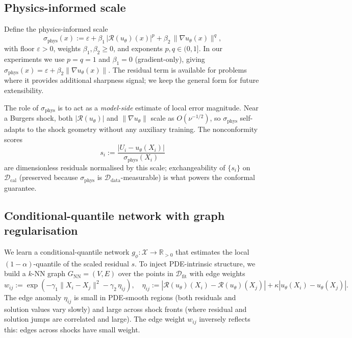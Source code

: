 \documentclass[11pt]{article}
\theoremstyle{definition}
\theoremstyle{remark}
\newcommand{\R}{\mathbb{R}}
\newcommand{\Ddata}{\mathcal{D}_{\text{data}}}
\newcommand{\Dfit}{\mathcal{D}_{\text{fit}}}
\newcommand{\Dcal}{\mathcal{D}_{\text{cal}}}
\newcommand{\sphys}{\sigma_{\mathrm{phys}}}
\newcommand{\Rop}{\mathcal{R}}
\begin{document}
\subsection{Physics-informed scale}
\label{sec:sphys}

Define the physics-informed scale
\begin{equation}
    \sphys(x) := \varepsilon + \beta_1\, |\Rop(u_\theta)(x)|^p + \beta_2\, \|\nabla u_\theta(x)\|^q,
    \label{eq:sphys}
\end{equation}
with floor $\varepsilon > 0$, weights $\beta_1, \beta_2 \geq 0$, and exponents $p, q \in (0, 1]$. In our experiments we use $p = q = 1$ and $\beta_1 = 0$ (gradient-only), giving $\sphys(x) = \varepsilon + \beta_2 \|\nabla u_\theta(x)\|$. The residual term is available for problems where it provides additional sharpness signal; we keep the general form for future extensibility.

The role of $\sphys$ is to act as a \emph{model-side} estimate of local error magnitude. Near a Burgers shock, both $|\Rop(u_\theta)|$ and $\|\nabla u_\theta\|$ scale as $O(\nu^{-1/2})$, so $\sphys$ self-adapts to the shock geometry without any auxiliary training. The nonconformity scores
\begin{equation}
    s_i := \frac{|U_i - u_\theta(X_i)|}{\sphys(X_i)}
    \label{eq:score}
\end{equation}
are dimensionless residuals normalised by this scale; exchangeability of $\{s_i\}$ on $\Dcal$ (preserved because $\sphys$ is $\Ddata$-measurable) is what powers the conformal guarantee.

\subsection{Conditional-quantile network with graph regularisation}
\label{sec:gphi}

We learn a conditional-quantile network $g_\phi : \mathcal{X} \to \R_{>0}$ that estimates the local $(1{-}\alpha)$-quantile of the scaled residual $s$. To inject PDE-intrinsic structure, we build a $k$-NN graph $G_{\text{NN}} = (V, E)$ over the points in $\Dfit$ with edge weights
\begin{equation}
    w_{ij} := \exp\!\left(-\gamma_1 \|X_i - X_j\|^2 - \gamma_2\, \eta_{ij}\right),
    \quad
    \eta_{ij} := |\Rop(u_\theta)(X_i) - \Rop(u_\theta)(X_j)| + \kappa |u_\theta(X_i) - u_\theta(X_j)|.
    \label{eq:edge}
\end{equation}
The edge anomaly $\eta_{ij}$ is small in PDE-smooth regions (both residuals and solution values vary slowly) and large across shock fronts (where residual and solution jumps are correlated and large). The edge weight $w_{ij}$ inversely reflects this: edges across shocks have small weight.
\end{document}
